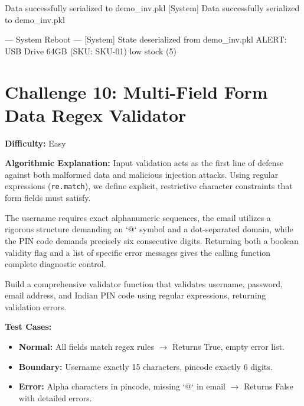 \begin{outputbox}
[System] Data successfully serialized to demo_inv.pkl
[System] Data successfully serialized to demo_inv.pkl

--- System Reboot ---
[System] State deserialized from demo_inv.pkl
ALERT: USB Drive 64GB (SKU: SKU-01) low stock (5)
\end{outputbox}

\section{Challenge 10: Multi-Field Form Data Regex Validator}

\textbf{Difficulty:} Easy

\textbf{Algorithmic Explanation:}
Input validation acts as the first line of defense against both malformed data and malicious injection attacks. Using regular expressions (\texttt{re.match}), we define explicit, restrictive character constraints that form fields must satisfy.

The username requires exact alphanumeric sequences, the email utilizes a rigorous structure demanding an `@` symbol and a dot-separated domain, while the PIN code demands precisely six consecutive digits. Returning both a boolean validity flag and a list of specific error messages gives the calling function complete diagnostic control.

\begin{practiceset}
Build a comprehensive validator function that validates username, password, email address, and Indian PIN code using regular expressions, returning validation errors.

\textbf{Test Cases:}
\begin{itemize}
    \item \textbf{Normal:} All fields match regex rules $\rightarrow$ Returns True, empty error list.
    \item \textbf{Boundary:} Username exactly 15 characters, pincode exactly 6 digits.
    \item \textbf{Error:} Alpha characters in pincode, missing `@` in email $\rightarrow$ Returns False with detailed errors.
\end{itemize}
\end{practiceset}

